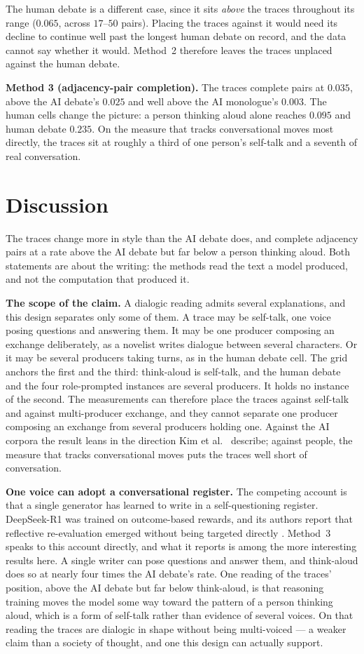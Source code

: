 \documentclass[10pt,twocolumn]{article}
\begin{document}
The human debate is a different case, since it sits \emph{above} the traces throughout its range
($0.065$, across $17$--$50$ pairs). Placing the traces against it would need its decline to continue
well past the longest human debate on record, and the data cannot say whether it would. Method~2
therefore leaves the traces unplaced against the human debate.

\textbf{Method 3 (adjacency-pair completion).} The traces complete pairs at $0.035$, above the AI
debate's $0.025$ and well above the AI monologue's $0.003$. The human cells change the picture: a
person thinking aloud alone reaches $0.095$ and human debate $0.235$. On the measure that tracks
conversational moves most directly, the traces sit at roughly a third of one person's self-talk and a
seventh of real conversation.

\section{Discussion}
The traces change more in style than the AI debate does, and complete adjacency pairs at a rate above
the AI debate but far below a person thinking aloud. Both statements are about the writing: the
methods read the text a model produced, and not the computation that produced it.

\textbf{The scope of the claim.} A dialogic reading admits several explanations, and this design
separates only some of them. A trace may be self-talk, one voice posing questions and answering them.
It may be one producer composing an exchange deliberately, as a novelist writes dialogue between
several characters. Or it may be several producers taking turns, as in the human debate cell. The
grid anchors the first and the third: think-aloud is self-talk, and the human debate and the four
role-prompted instances are several producers. It holds no instance of the second. The measurements
can therefore place the traces against self-talk and against multi-producer exchange, and they cannot
separate one producer composing an exchange from several producers holding one. Against the AI
corpora the result leans in the direction Kim et al.~\cite{kim2026} describe; against people, the
measure that tracks conversational moves puts the traces well short of conversation.

\textbf{One voice can adopt a conversational register.} The competing account is that a single
generator has learned to write in a self-questioning register. DeepSeek-R1 was trained on
outcome-based rewards, and its authors report that reflective re-evaluation emerged without being
targeted directly \cite{guo2025}. Method~3 speaks to this account directly, and what it reports is
among the more interesting results here. A single writer can pose questions and answer them, and
think-aloud does so at nearly four times the AI debate's rate. One reading of the traces' position,
above the AI debate but far below think-aloud, is that reasoning training moves the model some way
toward the pattern of a person thinking aloud, which is a form of self-talk rather than evidence of
several voices. On that reading the traces are dialogic in shape without being multi-voiced --- a
weaker claim than a society of thought, and one this design can actually support.
\end{document}
